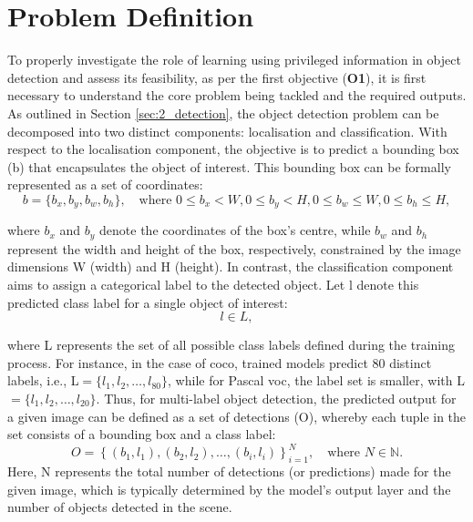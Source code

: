 \section{Problem Definition}
\label{sec:4_problem_definition}

To properly investigate the role of learning using privileged information in object detection and assess its feasibility, as per the first objective (\textbf{O1}), it is first necessary to understand the core problem being tackled and the required outputs. As outlined in Section \ref{sec:2_detection}, the object detection problem can be decomposed into two distinct components: localisation and classification.
With respect to the localisation component, the objective is to predict a bounding box (\gls{b}) that encapsulates the object of interest. This bounding box can be formally represented as a set of coordinates:
\begin{equation}
\label{eq:bounding_box}
b = \{b_x, b_y, b_w, b_h\}, \quad \text{where } 0 \leq b_x < W, 0 \leq b_y < H, 0 \leq b_w \leq W, 0 \leq b_h \leq H,
\end{equation}

\noindent where \( b_x \) and \( b_y \) denote the coordinates of the box's centre, while \( b_w \) and \( b_h \) represent the width and height of the box, respectively, constrained by the image dimensions \gls{W} (width) and \gls{H} (height).
In contrast, the classification component aims to assign a categorical label to the detected object. Let \gls{l} denote this predicted class label for a single object of interest:
\begin{equation}
\label{eq:classification_label}
l \in L,
\end{equation}

\noindent where \gls{L} represents the set of all possible class labels defined during the training process. For instance, in the case of \gls{coco}, trained models predict 80 distinct labels, i.e., \gls{L}$ = \{l_1, l_2, \dots, l_{80}\}$, while for Pascal \gls{voc}, the label set is smaller, with \gls{L}$ = \{l_1, l_2, \dots, l_{20}\}$.
Thus, for multi-label object detection, the predicted output for a given image can be defined as a set of detections (\gls{O}), whereby each tuple in the set consists of a bounding box and a class label:
\begin{equation}
\label{eq:multi_label_output}
O = \left\{ (b_1, l_1), (b_2, l_2), \ldots, (b_i, l_i) \right\}_{i=1}^{N}, \quad \text{where } N \in \mathbb{N} .
\end{equation}
Here, \gls{N} represents the total number of detections (or predictions) made for the given image, which is typically determined by the model's output layer and the number of objects detected in the scene.

